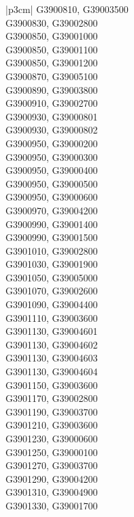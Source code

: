 \begin{customLongTable}{ |p{3cm}| }
G3900810, G39003500 \\ \hline
G3900830, G39002800 \\ \hline
G3900850, G39001000 \\ \hline
G3900850, G39001100 \\ \hline
G3900850, G39001200 \\ \hline
G3900870, G39005100 \\ \hline
G3900890, G39003800 \\ \hline
G3900910, G39002700 \\ \hline
G3900930, G39000801 \\ \hline
G3900930, G39000802 \\ \hline
G3900950, G39000200 \\ \hline
G3900950, G39000300 \\ \hline
G3900950, G39000400 \\ \hline
G3900950, G39000500 \\ \hline
G3900950, G39000600 \\ \hline
G3900970, G39004200 \\ \hline
G3900990, G39001400 \\ \hline
G3900990, G39001500 \\ \hline
G3901010, G39002800 \\ \hline
G3901030, G39001900 \\ \hline
G3901050, G39005000 \\ \hline
G3901070, G39002600 \\ \hline
G3901090, G39004400 \\ \hline
G3901110, G39003600 \\ \hline
G3901130, G39004601 \\ \hline
G3901130, G39004602 \\ \hline
G3901130, G39004603 \\ \hline
G3901130, G39004604 \\ \hline
G3901150, G39003600 \\ \hline
G3901170, G39002800 \\ \hline
G3901190, G39003700 \\ \hline
G3901210, G39003600 \\ \hline
G3901230, G39000600 \\ \hline
G3901250, G39000100 \\ \hline
G3901270, G39003700 \\ \hline
G3901290, G39004200 \\ \hline
G3901310, G39004900 \\ \hline
G3901330, G39001700 \\ \hline

\end{customLongTable}

